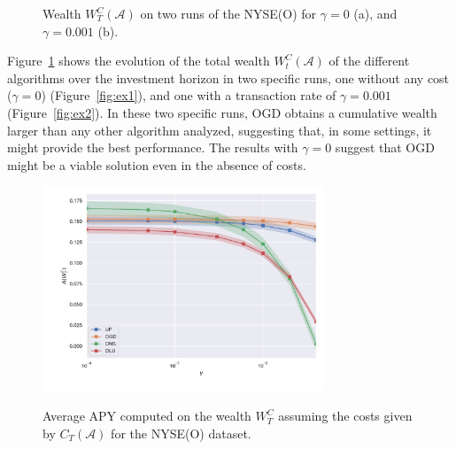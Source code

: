 \begin{figure}[ht!]
    \centering
\caption{Wealth $W_T^C(\mathcal{A})$ on two runs of the NYSE(O) for $\gamma = 0$ (a), and $\gamma = 0.001$ (b).} \label{fig:algo_copmarison}
\end{figure}

Figure~\ref{fig:algo_copmarison} shows the evolution of the total wealth ${W}^C_t(\mathcal{A})$ of the different algorithms over the investment horizon in two specific runs, one without any cost ($\gamma = 0$) (Figure~\ref{fig:ex1}), and one with a transaction rate of $\gamma = 0.001$ (Figure~\ref{fig:ex2}).
In these two specific runs, OGD obtains a cumulative wealth larger than any other algorithm analyzed, suggesting that, in some settings, it might provide the best performance.
The results with $\gamma = 0$ suggest that OGD might be a viable solution even in the absence of costs.


\begin{figure}[ht!]
\centering
{\includegraphics[width=0.75\textwidth,keepaspectratio]{img/fig_w_decay_l1.pdf}} 
\caption{Average APY computed on the wealth $W_T^C$ assuming the costs given by $C_T(\mathcal{A})$ for the NYSE(O) dataset.}
\label{fig:wealth_decay_l1}
\end{figure}

